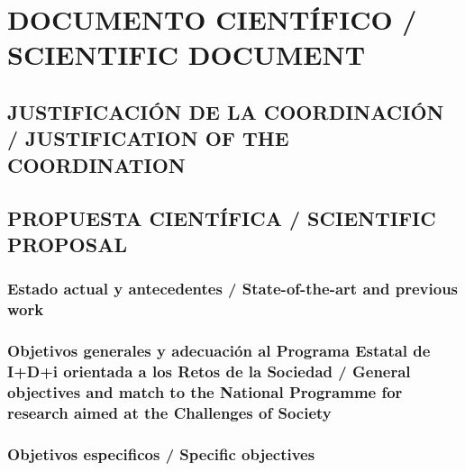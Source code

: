 \documentclass[a4paper,11pt,oneside]{article}
\begin{document}
\section{DOCUMENTO CIENTÍFICO / SCIENTIFIC DOCUMENT}


\subsection{JUSTIFICACIÓN DE LA COORDINACIÓN / JUSTIFICATION OF THE COORDINATION}
\vspace{0.3cm}



\subsection{PROPUESTA CIENTÍFICA / SCIENTIFIC PROPOSAL}

\subsubsection{Estado actual y antecedentes /  State-of-the-art and previous work}



\subsubsection{Objetivos generales y adecuación al Programa Estatal de I+D+i orientada a los Retos de la Sociedad / General objectives and match to the National Programme for research aimed at the Challenges of Society}

%



\subsubsection{Objetivos especificos / Specific objectives}
%
%




\end{document}
